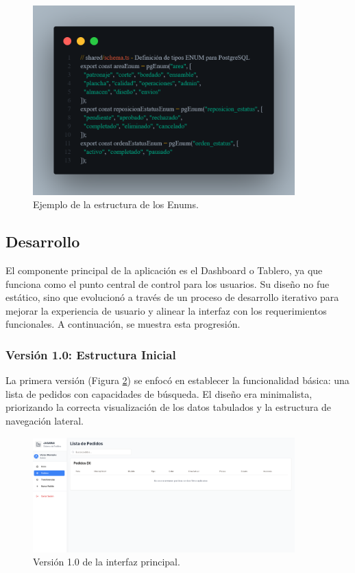 \documentclass[12pt,letterpaper,spanish]{report}
\begin{document}
\begin{figure}[H]
    \centering
    \includegraphics[width=0.9\textwidth]{enums.png}
    \caption{Ejemplo de la estructura de los Enums.}
    \label{fig:enums}
\end{figure}


\subsection{Desarrollo}

\label{sec:evolucion_dashboard}

El componente principal de la aplicación es el Dashboard o Tablero, ya que funciona como el punto central de control para los usuarios. Su diseño no fue estático, sino que evolucionó a través de un proceso de desarrollo iterativo para mejorar la experiencia de usuario y alinear la interfaz con los requerimientos funcionales. A continuación, se muestra esta progresión.

\subsubsection{Versión 1.0: Estructura Inicial}
La primera versión (Figura \ref{fig:v1}) se enfocó en establecer la funcionalidad básica: una lista de pedidos con capacidades de búsqueda. El diseño era minimalista, priorizando la correcta visualización de los datos tabulados y la estructura de navegación lateral.

\begin{figure}[H]
    \centering
    \includegraphics[width=0.9\textwidth]{V1.0.png}
    \caption{Versión 1.0 de la interfaz principal.}
    \label{fig:v1}
\end{figure}
\end{document}
